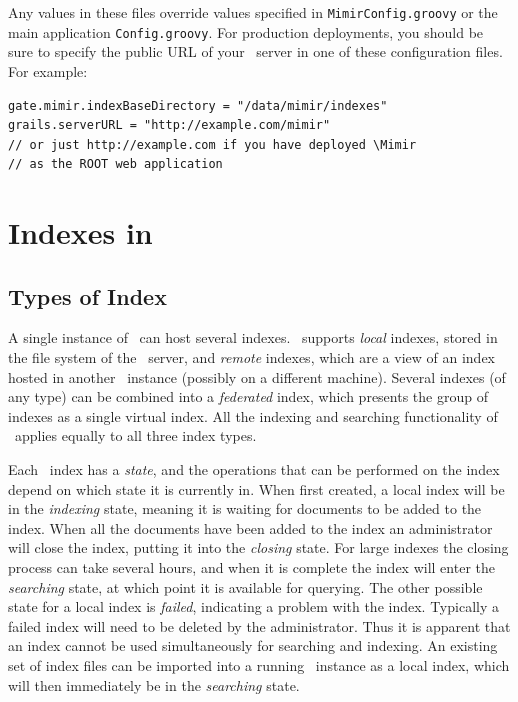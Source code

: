 Any values in these files override values specified in {\tt MimirConfig.groovy}
or the main application {\tt Config.groovy}.  For production deployments, you
should be sure to specify the public URL of your \Mimir\ server in one of these
configuration files.  For example:
\begin{lstlisting}[texcl]
gate.mimir.indexBaseDirectory = "/data/mimir/indexes"
grails.serverURL = "http://example.com/mimir"
// or just http://example.com if you have deployed \Mimir
// as the ROOT web application
\end{lstlisting}

\section{Indexes in \Mimir}

\subsection{Types of Index}\label{sec:admin:index-types}

A single instance of \Mimir\ can host several indexes.  \Mimir\ supports
{\em local} indexes, stored in the file system of the \Mimir\ server, and
{\em remote} indexes, which are a view of an index hosted in another \Mimir\
instance (possibly on a different machine).  Several indexes (of any type) can
be combined into a {\em federated} index, which presents the group of indexes as
a single virtual index.  All the indexing and searching functionality of
\Mimir\ applies equally to all three index types.

Each \Mimir\ index has a {\em state}, and the operations that can be performed
on the index depend on which state it is currently in.  When first created, a
local index will be in the {\em indexing} state, meaning it is waiting for
documents to be added to the index.  When all the documents have been added to
the index an administrator will close the index, putting it into the {\em
closing} state.  For large indexes the closing process can take several hours,
and when it is complete the index will enter the {\em searching} state, at
which point it is available for querying.  The other possible state for a local
index is {\em failed}, indicating a problem with the index.  Typically a failed
index will need to be deleted by the administrator.  Thus it is apparent that
an index cannot be used simultaneously for searching and indexing.  An existing
set of index files can be imported into a running \Mimir\ instance as a local
index, which will then immediately be in the {\em searching} state.

